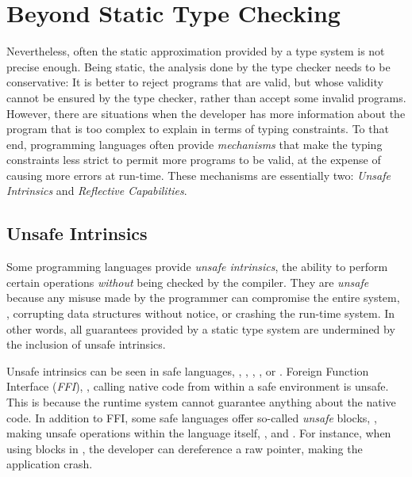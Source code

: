 

\section{Beyond Static Type Checking}

Nevertheless, often the static approximation provided by a type system is not precise enough.
Being static, the analysis done by the type checker needs to be conservative:
It is better to reject programs that are valid,
but whose validity cannot be ensured by the type checker,
rather than accept some invalid programs.
However, there are situations when the developer has more information
about the program that is too complex to explain in terms of typing constraints.
To that end, programming languages often provide \emph{mechanisms} that 
make the typing constraints less strict
to permit more programs to be valid,
at the expense of causing more errors at run-time.
These mechanisms are essentially two:
\emph{Unsafe Intrinsics} and \emph{Reflective Capabilities}.

\subsection*{Unsafe Intrinsics}

Some programming languages provide \emph{unsafe intrinsics},
the ability to perform certain operations \emph{without} being checked by the compiler.
They are \emph{unsafe} because any misuse made by the programmer can compromise the entire system, \eg{},
corrupting data structures without notice, or
crashing the run-time system.
In other words,
all guarantees provided by a static type system are undermined by the inclusion of unsafe intrinsics.

Unsafe intrinsics can be seen in safe languages, \eg{},
\java{}, \csharp{}, \rust{}, or \haskell{}.
Foreign Function Interface (\emph{FFI}), \ie{}, calling native code from within a safe environment is unsafe.
This is because the runtime system cannot guarantee anything about the native code.
In addition to FFI,
some safe languages offer so-called \emph{unsafe} blocks, \ie{},
making unsafe operations within the language itself, \eg{},
\csharp{}%
and
\rust{}.%
For instance,
when using  blocks in \rust{},
the developer can dereference a raw pointer,
making the application crash.

